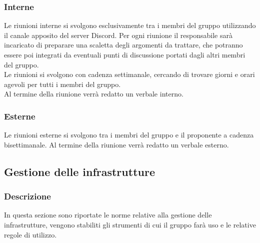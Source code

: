 \subsubsection{Interne}
Le riunioni interne si svolgono esclusivamente tra i membri del gruppo
utilizzando il canale apposito del server Discord. Per ogni riunione il
responsabile sarà incaricato di preparare una scaletta degli argomenti da
trattare, che potranno essere poi integrati da eventuali punti di discussione
portati dagli altri membri del gruppo.\\ Le riunioni si svolgono con cadenza settimanale, cercando di trovare giorni e orari agevoli per tutti i membri del
gruppo. \\Al termine della riunione verrà redatto un verbale interno.

\subsubsection{Esterne}
Le riunioni esterne si svolgono tra i membri del gruppo e il proponente a
cadenza bisettimanale. Al termine della riunione verrà redatto un verbale
esterno.

\subsection{Gestione delle infrastrutture}
\subsubsection{Descrizione}
In questa sezione sono riportate le norme relative alla gestione delle
infrastrutture, vengono stabiliti gli strumenti di cui il gruppo farà uso e le
relative regole di utilizzo.

